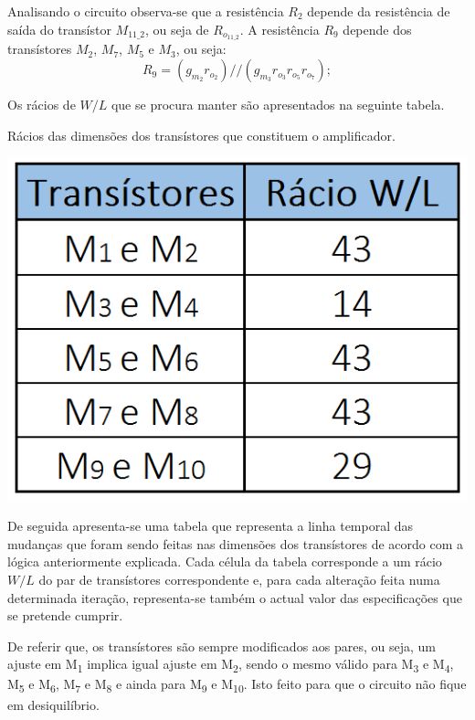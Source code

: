 \documentclass[11pt]{article}
\numberwithin{equation}{section}
\begin{document}
Analisando o circuito observa-se que a resistência $R_{2}$ depende da resistência de saída do transístor $M_{11\_2}$, ou seja de $R_{o_{11\_2}}$. A resistência $R_{9}$ depende dos transístores $M_{2}$, $M_{7}$, $M_{5}$ e  $M_{3}$, ou seja:
	\vspace{-3mm}
	\begin{equation}
	R_{9} = \left(g_{m_2}r_{o_2}\right)//\left(g_{m_3}r_{o_3}r_{o_5}r_{o_7}\right);
	\end{equation}
	


Os rácios de $W/L$ que se procura manter são apresentados na seguinte tabela.

\begin{table}[H]
	\centering
	\caption{Rácios das dimensões dos transístores que constituem o amplificador.}
	\vspace{-1.5mm}
	\includegraphics[keepaspectratio=true, scale=0.33]{teoricas/racios}
\end{table}

De seguida apresenta-se uma tabela que representa a linha temporal das mudanças que foram sendo feitas nas dimensões dos transístores de acordo com a lógica anteriormente explicada. Cada célula da tabela corresponde a um rácio $W/L$ do par de transístores correspondente e, para cada alteração feita numa determinada iteração, representa-se também o actual valor das especificações que se pretende cumprir.

De referir que, os transístores são sempre modificados aos pares, ou seja, um ajuste em M\textsubscript{1} implica igual ajuste em M\textsubscript{2}, sendo o mesmo válido para M\textsubscript{3} e M\textsubscript{4}, M\textsubscript{5} e M\textsubscript{6}, M\textsubscript{7} e M\textsubscript{8} e ainda para M\textsubscript{9} e M\textsubscript{10}. Isto feito para que o circuito não fique em desiquilíbrio.
\end{document}
